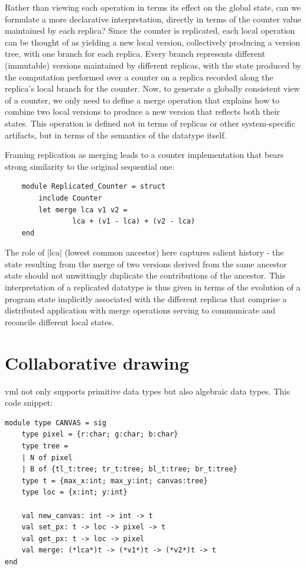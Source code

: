 \documentclass[twocolumn,9pt]{extarticle}
\newcommand{\name}{{\sc vml}\xspace}
\begin{document}
Rather than viewing each operation in terms its effect on the global state, can
we formulate a more declarative interpretation, directly in terms of the
counter value maintained by each replica? Since the counter is replicated, each
local operation can be thought of as yielding a new local version, collectively
producing a version tree, with one branch for each replica.  Every branch
represents different (immutable) versions maintained by different replicas, with
the state produced by the computation performed over a counter on a replica
recorded along the replica's local branch for the counter.  Now, to generate a
globally consistent view of a counter, we only need to define a merge operation
that explains how to combine two local versions to produce a new version that
reflects both their states. This operation is defined not in terms of replicas
or other system-specific artifacts, but in terms of the semantics of the
datatype itself.

Framing replication as merging leads to a counter implementation that bears
strong similarity to the original sequential one:
\begin{lstlisting}
	module Replicated_Counter = struct
		include Counter
		let merge lca v1 v2 =
				lca + (v1 - lca) + (v2 - lca)
	end
\end{lstlisting}
The role of |lca| (lowest common ancestor) here captures salient
history - the state resulting from the merge of two versions derived
from the same ancestor state should not unwittingly duplicate the
contributions of the ancestor. This interpretation of a replicated
datatype is thus given in terms of the evolution of a program state
implicitly associated with the different replicas that comprise a
distributed application with merge operations serving to communicate
and reconcile different local states.

\section{Collaborative drawing}

\name not only supports primitive data types but also algebraic data types.
This code snippet:

\begin{lstlisting}
module type CANVAS = sig
	type pixel = {r:char; g:char; b:char}
	type tree =
	| N of pixel
	| B of {tl_t:tree; tr_t:tree; bl_t:tree; br_t:tree}
	type t = {max_x:int; max_y:int; canvas:tree}
	type loc = {x:int; y:int}

	val new_canvas: int -> int -> t
	val set_px: t -> loc -> pixel -> t
	val get_px: t -> loc -> pixel
	val merge: (*lca*)t -> (*v1*)t -> (*v2*)t -> t
end
\end{lstlisting}
\end{document}
